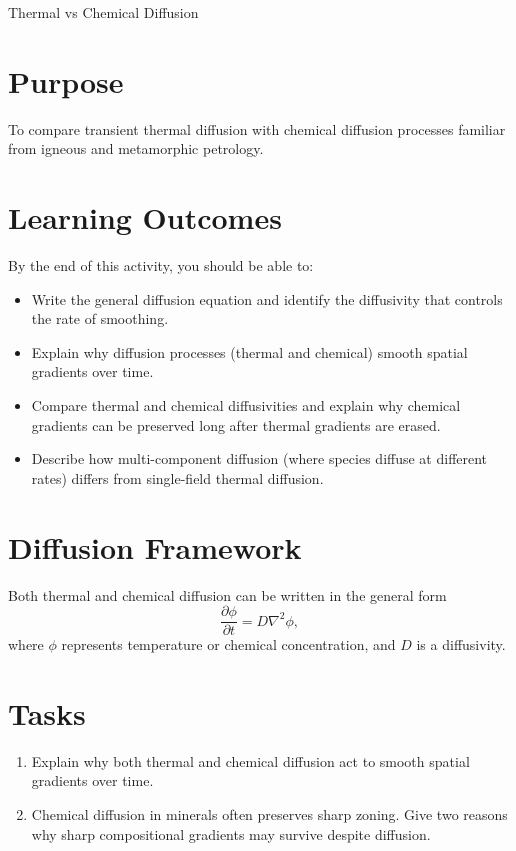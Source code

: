 \begin{activity}{Thermal vs Chemical Diffusion}

\section*{Purpose}
To compare transient thermal diffusion with chemical diffusion processes familiar from igneous and metamorphic petrology.

{\color{red}
\section*{Learning Outcomes}

By the end of this activity, you should be able to:
\begin{itemize}
  \item Write the general diffusion equation and identify the diffusivity that controls the rate of smoothing.
  \item Explain why diffusion processes (thermal and chemical) smooth spatial gradients over time.
  \item Compare thermal and chemical diffusivities and explain why chemical gradients can be preserved long after thermal gradients are erased.
  \item Describe how multi-component diffusion (where species diffuse at different rates) differs from single-field thermal diffusion.
\end{itemize}
}

\section*{Diffusion Framework}
Both thermal and chemical diffusion can be written in the general form
\[
\frac{\partial \phi}{\partial t} = D \nabla^2 \phi,
\]
where $\phi$ represents temperature or chemical concentration, and $D$ is a diffusivity.

\section*{Tasks}
\begin{enumerate}
  \item Explain why both thermal and chemical diffusion act to smooth spatial gradients over time.
  \answerbox[3cm]

  \item Chemical diffusion in minerals often preserves sharp zoning. Give two reasons why sharp compositional gradients may survive despite diffusion.
  \answerbox[3cm]


\end{enumerate}
\end{activity}
